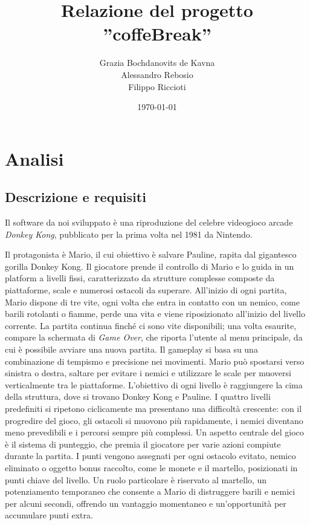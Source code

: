 \documentclass[a4paper,12pt]{report}
\title{Relazione del progetto\\''coffeBreak''}
\author{Grazia Bochdanovits de Kavna\\
Alessandro Rebosio\\
Filippo Riccioti
}
\date{\today}
\begin{document}
\maketitle

\tableofcontents

\chapter{Analisi}

\section{Descrizione e requisiti}
Il software da noi sviluppato è una riproduzione del celebre videogioco arcade \textit{Donkey Kong}, pubblicato per la prima volta nel 1981 da Nintendo.

Il protagonista è Mario, il cui obiettivo è salvare Pauline, rapita dal gigantesco gorilla Donkey Kong.
%
Il giocatore prende il controllo di Mario e lo guida in un platform a livelli fissi, caratterizzato da strutture complesse
composte da piattaforme, scale e numerosi ostacoli da superare.
%
All'inizio di ogni partita, Mario dispone di tre vite, ogni volta che entra in contatto con un nemico, come barili rotolanti o fiamme, perde una vita e viene riposizionato
all'inizio del livello corrente.
%
La partita continua finché ci sono vite disponibili; una volta esaurite, compare la schermata di \textit{Game Over},
che riporta l'utente al menu principale, da cui è possibile avviare una nuova partita.
%
Il gameplay si basa su una combinazione di tempismo e precisione nei movimenti.
Mario può spostarsi verso sinistra o destra, saltare per evitare i nemici e utilizzare le scale per muoversi verticalmente tra le piattaforme.
L'obiettivo di ogni livello è raggiungere la cima della struttura, dove si trovano Donkey Kong e Pauline.
%
I quattro livelli predefiniti si ripetono ciclicamente ma presentano una difficoltà crescente:
con il progredire del gioco, gli ostacoli si muovono più rapidamente, i nemici diventano meno prevedibili e i percorsi sempre più complessi.
%
Un aspetto centrale del gioco è il sistema di punteggio, che premia il giocatore per varie azioni compiute durante la partita.
I punti vengono assegnati per ogni ostacolo evitato, nemico eliminato o oggetto bonus raccolto, come le monete e il martello,
posizionati in punti chiave del livello.
%
Un ruolo particolare è riservato al martello, un potenziamento temporaneo che consente a Mario di distruggere barili e nemici per alcuni secondi,
offrendo un vantaggio momentaneo e un'opportunità per accumulare punti extra.
\end{document}
